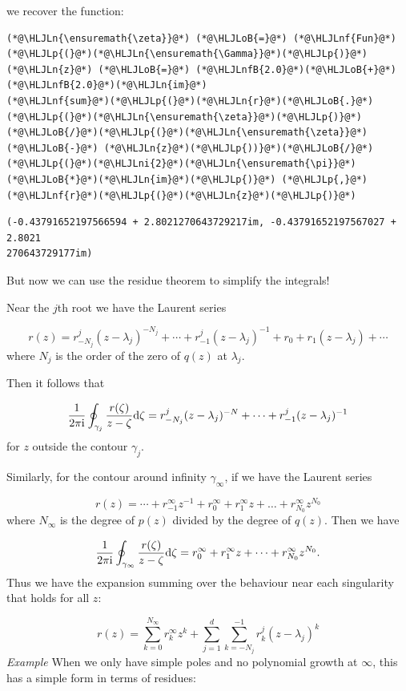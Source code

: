 \documentclass[12pt,a4paper]{article}
\newcommand{\HLJLn}[1]{#1}
\newcommand{\HLJLnf}[1]{\textcolor[RGB]{66,102,213}{#1}}
\newcommand{\HLJLnfB}[1]{\textcolor[RGB]{59,151,46}{#1}}
\newcommand{\HLJLni}[1]{\textcolor[RGB]{59,151,46}{#1}}
\newcommand{\HLJLoB}[1]{\textcolor[RGB]{102,102,102}{\textbf{#1}}}
\newcommand{\HLJLp}[1]{#1}
\def\D{ {\rm d} }
\def\I{ {\rm i} }
\begin{document}
we recover the function:


\begin{lstlisting}
(*@\HLJLn{\ensuremath{\zeta}}@*) (*@\HLJLoB{=}@*) (*@\HLJLnf{Fun}@*)(*@\HLJLp{(}@*)(*@\HLJLn{\ensuremath{\Gamma}}@*)(*@\HLJLp{)}@*)
(*@\HLJLn{z}@*) (*@\HLJLoB{=}@*) (*@\HLJLnfB{2.0}@*)(*@\HLJLoB{+}@*)(*@\HLJLnfB{2.0}@*)(*@\HLJLn{im}@*)
(*@\HLJLnf{sum}@*)(*@\HLJLp{(}@*)(*@\HLJLn{r}@*)(*@\HLJLoB{.}@*)(*@\HLJLp{(}@*)(*@\HLJLn{\ensuremath{\zeta}}@*)(*@\HLJLp{)}@*)(*@\HLJLoB{/}@*)(*@\HLJLp{(}@*)(*@\HLJLn{\ensuremath{\zeta}}@*) (*@\HLJLoB{-}@*) (*@\HLJLn{z}@*)(*@\HLJLp{))}@*)(*@\HLJLoB{/}@*)(*@\HLJLp{(}@*)(*@\HLJLni{2}@*)(*@\HLJLn{\ensuremath{\pi}}@*)(*@\HLJLoB{*}@*)(*@\HLJLn{im}@*)(*@\HLJLp{)}@*) (*@\HLJLp{,}@*) (*@\HLJLnf{r}@*)(*@\HLJLp{(}@*)(*@\HLJLn{z}@*)(*@\HLJLp{)}@*)
\end{lstlisting}

\begin{lstlisting}
(-0.43791652197566594 + 2.8021270643729217im, -0.43791652197567027 + 2.8021
270643729177im)
\end{lstlisting}


But now we can use the residue theorem to simplify the integrals! 

Near the $j$th root we have the Laurent series

\[
r(z) = r_{-N_j}^j (z-\lambda_j)^{-N_j}  + \cdots + r_{-1}^j (z-\lambda_j)^{-1} + r_0 + r_1 (z-\lambda_j) + \cdots
\]
where $N_j$ is the order of the zero of $q(z)$ at $\lambda_j$.

Then it follows that

\[
{1 \over 2 \pi \I} \oint_{\gamma_j} {r(\zeta) \over z - \zeta} \D\zeta = 
r_{-N_j}^j (z-\lambda_j)^{-N}  + \cdots + r_{-1}^j (z-\lambda_j)^{-1}
\]
for $z$ outside the contour $\gamma_j$.

Similarly, for the contour around infinity $\gamma_\infty$, if we have the Laurent series

\[
r(z) = \cdots + r_{-1}^\infty z^{-1} + r_0^\infty  + r_1^\infty z + \dots + r_{N_0}^\infty z^{N_0}
\]
where $N_\infty$ is the degree of $p(z)$ divided by the degree of $q(z)$.  Then we have

\[
{1 \over 2 \pi \I} \oint_{\gamma_\infty} {r(\zeta) \over z - \zeta} \D\zeta = 
r_0^\infty + r_1^\infty z + \cdots +  r_{N_0}^\infty z^{N_0}.
\]
Thus we have the expansion summing over the behaviour near each singularity that holds for all $z$:

\[
r(z) = \sum_{k=0}^{N_\infty} r_k^\infty z^k  +  \sum_{j=1}^d \sum_{k = -N_j}^{-1} r_k^j (z - \lambda_j)^k
\]
\emph{Example} When we only have simple poles and no polynomial growth at $\infty$, this has a simple form in terms of residues:
\end{document}
